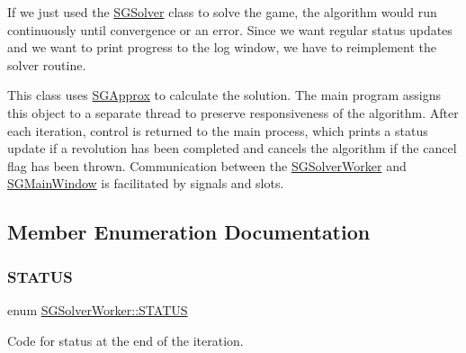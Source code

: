 If we just used the \hyperlink{classSGSolver}{S\+G\+Solver} class to solve the game, the algorithm would run continuously until convergence or an error. Since we want regular status updates and we want to print progress to the log window, we have to reimplement the solver routine.

This class uses \hyperlink{classSGApprox}{S\+G\+Approx} to calculate the solution. The main program assigns this object to a separate thread to preserve responsiveness of the algorithm. After each iteration, control is returned to the main process, which prints a status update if a revolution has been completed and cancels the algorithm if the cancel flag has been thrown. Communication between the \hyperlink{classSGSolverWorker}{S\+G\+Solver\+Worker} and \hyperlink{classSGMainWindow}{S\+G\+Main\+Window} is facilitated by signals and slots. 

\subsection{Member Enumeration Documentation}
\mbox{\label{classSGSolverWorker_abf12cd2fb0c6957ef6d5be6248c60abf}} 
\subsubsection{\texorpdfstring{S\+T\+A\+T\+US}{STATUS}}
{\footnotesize\ttfamily enum \hyperlink{classSGSolverWorker_abf12cd2fb0c6957ef6d5be6248c60abf}{S\+G\+Solver\+Worker\+::\+S\+T\+A\+T\+US}}



Code for status at the end of the iteration. 

